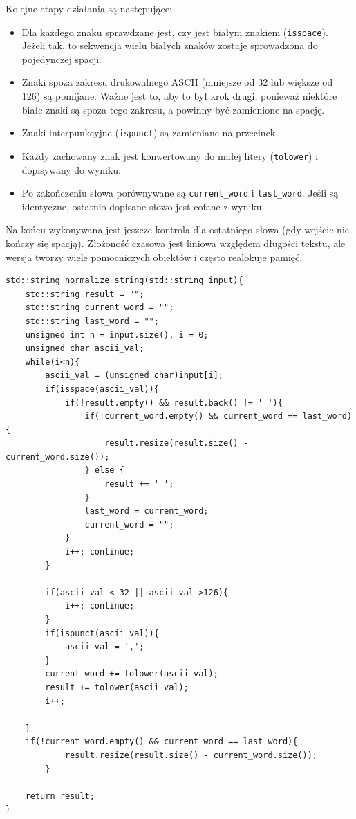 \documentclass{article}
\begin{document}
Kolejne etapy działania są następujące:
\begin{itemize}
    \item Dla każdego znaku sprawdzane jest, czy jest białym znakiem (\texttt{isspace}). Jeżeli tak, to sekwencja wielu białych znaków zostaje sprowadzona do pojedynczej spacji.
    \item Znaki spoza zakresu drukowalnego ASCII (mniejsze od 32 lub większe od 126) są pomijane.
    Ważne jest to, aby to był krok drugi, ponieważ niektóre białe znaki są spoza tego zakresu, a powinny być zamienione na spację.
    \item Znaki interpunkcyjne (\texttt{ispunct}) są zamieniane na przecinek.
    \item Każdy zachowany znak jest konwertowany do małej litery (\texttt{tolower}) i dopisywany do wyniku.
    \item Po zakończeniu słowa porównywane są \texttt{current\_word} i \texttt{last\_word}. Jeśli są identyczne, ostatnio dopisane słowo jest cofane z wyniku.
\end{itemize}
Na końcu wykonywana jest jeszcze kontrola dla ostatniego słowa (gdy wejście nie kończy się spacją). Złożoność czasowa jest liniowa względem długości tekstu, ale wersja tworzy wiele pomocniczych obiektów i często realokuje pamięć.
\begin{lstlisting}[caption={Kod funkcji \texttt{normalize\_string} w wersji 1}]
std::string normalize_string(std::string input){
    std::string result = "";
    std::string current_word = "";
    std::string last_word = "";
    unsigned int n = input.size(), i = 0;
    unsigned char ascii_val;
    while(i<n){
        ascii_val = (unsigned char)input[i];
        if(isspace(ascii_val)){
            if(!result.empty() && result.back() != ' '){
                if(!current_word.empty() && current_word == last_word){
                    result.resize(result.size() - current_word.size());
                } else {
                    result += ' ';
                }
                last_word = current_word;
                current_word = "";
            }
            i++; continue;
        }

        if(ascii_val < 32 || ascii_val >126){
            i++; continue;
        }
        if(ispunct(ascii_val)){
            ascii_val = ',';
        }
        current_word += tolower(ascii_val);
        result += tolower(ascii_val);
        i++;
        
    }
    if(!current_word.empty() && current_word == last_word){
            result.resize(result.size() - current_word.size());
        }
        
    return result;
}
\end{lstlisting}
\newpage
\end{document}

